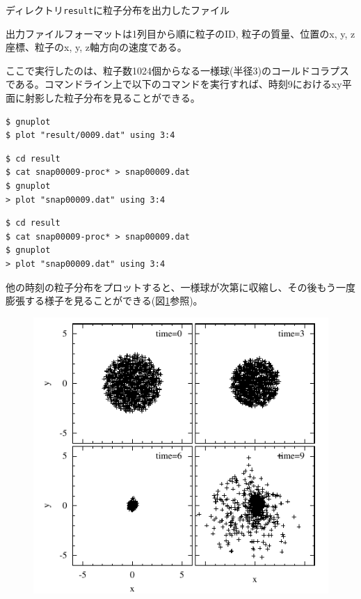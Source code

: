 ディレクトリ\texttt{result}に粒子分布を出力したファイル

出力ファイルフォーマットは1列目から順に粒子のID, 粒子の質量、位置のx, y, z座標、粒子のx, y, z軸方向の速度である。

ここで実行したのは、粒子数1024個からなる一様球(半径3)のコールドコラプスである。コマンドライン上で以下のコマンドを実行すれば、時刻9におけるxy平面に射影した粒子分布を見ることができる。
\ifCpp%
\begin{screen}
\begin{verbatim}
$ gnuplot
$ plot "result/0009.dat" using 3:4
\end{verbatim}
\end{screen}
\endifCpp
\ifFtn%
\begin{screen}
\begin{verbatim}
$ cd result
$ cat snap00009-proc* > snap00009.dat
$ gnuplot
> plot "snap00009.dat" using 3:4
\end{verbatim}
\end{screen}
\endifFtn
\ifC%
\begin{screen}
\begin{verbatim}
$ cd result
$ cat snap00009-proc* > snap00009.dat
$ gnuplot
> plot "snap00009.dat" using 3:4
\end{verbatim}
\end{screen}
\endifC

他の時刻の粒子分布をプロットすると、一様球が次第に収縮し、その後もう一度膨張する様子を見ることができる(図\ref{fig:nbody}参照)。

\begin{figure}
\begin{center}
\includegraphics[width=0.75\linewidth]{fig/nbody.pdf}
\end{center}
\caption{}
\label{fig:nbody}
\end{figure}

